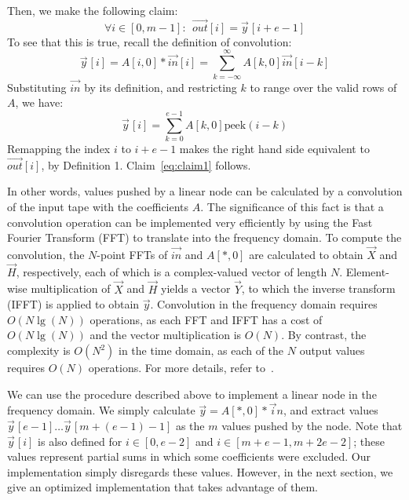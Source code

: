 \documentclass{sig-alternate}
\begin{document}
{Then, we make the following claim:
\begin{equation}
\label{eq:claim1}
\forall i \in [0, m-1]:~~{\vec{out}}[i] = {\vec y}\hspace{1pt}[i+e-1]
\end{equation}
To see that this is true, recall the definition of convolution:
\[
  {\vec y}\hspace{1pt}[i] = A[i,0] * \vec{in}[i] = \sum_{k=-\infty}^{\infty} A[k,0] \vec{in}[i-k]
\]
Substituting $\vec{in}$ by its definition, and restricting $k$ to
range over the valid rows of $A$, we have:
\[
  {\vec y}\hspace{1pt}[i] = \sum_{k=0}^{e-1} A[k,0] \mbox{peek}(i-k)
\]
Remapping the index $i$ to $i+e-1$ makes the right hand side
equivalent to ${\vec{out}}[i]$, by Definition 1.
Claim~\ref{eq:claim1} follows.

In other words, values pushed by a linear node can be calculated by a
convolution of the input tape with the coefficients $A$.  The
significance of this fact is that a convolution operation can be
implemented very efficiently by using the Fast Fourier Transform (FFT)
to translate into the frequency domain.  To compute the convolution,
the $N$-point FFTs of $\vec{in}$ and $A[*,0]$ are calculated to obtain
$\vec{X}$ and $\vec{H}$, respectively, each of which is a
complex-valued vector of length $N$.  Element-wise multiplication of
$\vec{X}$ and $\vec{H}$ yields a vector $\vec{Y}$, to which the
inverse transform (IFFT) is applied to obtain $\vec{y}$.  Convolution
in the frequency domain requires $O(N \lg(N))$ operations, as each FFT
and IFFT has a cost of $O(N \lg (N))$ and the vector multiplication is
$O(N)$.  By contrast, the complexity is $O(N^2)$ in the time domain,
as each of the $N$ output values requires $O(N)$ operations.  For more
details, refer to~\cite{oppenheim-discrete}.

We can use the procedure described above to implement a linear node in
the frequency domain.  We simply calculate ${\vec y} = A[*,0] * {\vec
in}$, and extract values ${\vec y}\hspace{1pt}[e-1] \dots {\vec y}\hspace{1pt}[m+(e-1)-1]$ as
the $m$ values pushed by the node.  Note that ${\vec y}\hspace{1pt}[i]$ is also
defined for $i \in [0, e-2]$ and $i \in [m+e-1,m+2e-2]$; these values
represent partial sums in which some coefficients were excluded.  Our
{\naive} implementation simply disregards these values.  However, in the
next section, we give an optimized implementation that takes advantage
of them.

}
\end{document}
